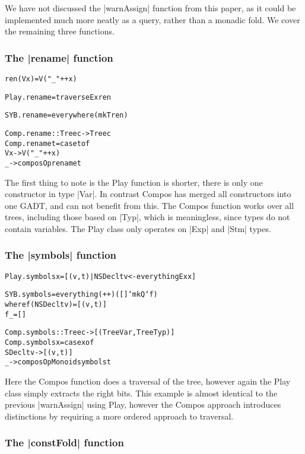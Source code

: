 \documentclass[preprint]{sigplanconf}
\newenvironment{code}{\begin{alltt}\small}{\end{alltt}}
\begin{document}
We have not discussed the |warnAssign| function from this paper, as it could be implemented much more neatly as a query, rather than a monadic fold. We cover the remaining three functions.

\subsubsection{The |rename| function}

\begin{code}
ren (V x) = V ("_" ++ x)

Play.rename = traverseEx ren

SYB.rename = everywhere (mkT ren)

Comp.rename :: Tree c -> Tree c
Comp.rename t = case t of
    V x -> V ("_" ++ x)
    _   -> composOp rename t
\end{code}

The first thing to note is the Play function is shorter, there is only one constructor in type |Var|. In contrast Compos has merged all constructors into one GADT, and can not benefit from this. The Compos function works over all trees, including those based on |Typ|, which is meaningless, since types do not contain variables. The Play class only operates on |Exp| and |Stm| types.


\subsubsection{The |symbols| function}

\begin{code}
Play.symbols x = [(v,t) | NSDecl t v <- everythingEx x]

SYB.symbols = everything (++) ([] `mkQ` f)
    where  f (NSDecl t v)  = [(v,t)]
           f _             = []

Comp.symbols :: Tree c -> [(Tree Var, Tree Typ)]
Comp.symbols x = case x of
    SDecl t v -> [(v,t)]
    _ -> composOpMonoid symbols t
\end{code}

Here the Compos function does a traversal of the tree, however again the Play class simply extracts the right bits. This example is almost identical to the previous |warnAssign| using Play, however the Compos approach introduces distinctions by requiring a more ordered approach to traversal.


\subsubsection{The |constFold| function}
\end{document}
